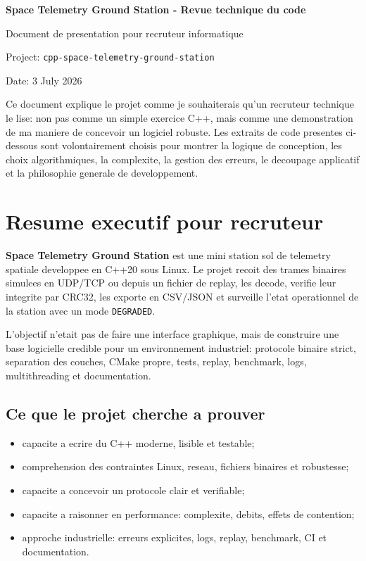 \documentclass[10pt,a4paper]{article}
\begin{document}
\begin{titlepage}
\centering
\vspace*{2.5cm}
{\Huge\bfseries Space Telemetry Ground Station - Revue technique du code\par}
\vspace{0.5cm}
{\Large Document de presentation pour recruteur informatique\par}
\vspace{1.5cm}
{\large Project: \texttt{cpp-space-telemetry-ground-station}\par}
\vspace{0.4cm}
{\large Date: 3 July 2026\par}
\vfill
\begin{minipage}{0.82\textwidth}
\small

Ce document explique le projet comme je souhaiterais qu'un recruteur technique le lise: non pas comme un simple exercice C++, mais comme une demonstration de ma maniere de concevoir un logiciel robuste. Les extraits de code presentes ci-dessous sont volontairement choisis pour montrer la logique de conception, les choix algorithmiques, la complexite, la gestion des erreurs, le decoupage applicatif et la philosophie generale de developpement.
\end{minipage}
\vfill
\end{titlepage}
\tableofcontents
\newpage

\section{Resume executif pour recruteur}

\textbf{Space Telemetry Ground Station} est une mini station sol de telemetry spatiale developpee en C++20 sous Linux. Le projet recoit des trames binaires simulees en UDP/TCP ou depuis un fichier de replay, les decode, verifie leur integrite par CRC32, les exporte en CSV/JSON et surveille l'etat operationnel de la station avec un mode \texttt{DEGRADED}.

L'objectif n'etait pas de faire une interface graphique, mais de construire une base logicielle credible pour un environnement industriel: protocole binaire strict, separation des couches, CMake propre, tests, replay, benchmark, logs, multithreading et documentation.

\subsection{Ce que le projet cherche a prouver}
\begin{itemize}
  \item capacite a ecrire du C++ moderne, lisible et testable;
  \item comprehension des contraintes Linux, reseau, fichiers binaires et robustesse;
  \item capacite a concevoir un protocole clair et verifiable;
  \item capacite a raisonner en performance: complexite, debits, effets de contention;
  \item approche industrielle: erreurs explicites, logs, replay, benchmark, CI et documentation.
\end{itemize}
\end{document}
